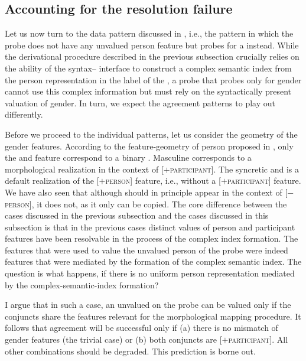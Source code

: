 \documentclass[output=paper,modfontsnewtxmath,hidelinks]{langscibook}
\begin{document}
\subsection{Accounting for the resolution failure}

Let us now turn to the data pattern discussed in , i.e., the pattern in which the probe does not have any unvalued person feature but probes for a  instead. While the derivational procedure described in the previous subsection crucially relies on the ability of the syntax-- interface to construct a complex semantic index from the person representation in the label of the , a probe that probes only for gender cannot use this complex information but must rely on the syntactically present valuation of gender. In turn, we expect the agreement patterns to play out differently. 

Before we proceed to the individual patterns, let us consider the geometry of the gender features. According to the feature-geometry of person proposed in , only the   and  feature correspond to a binary . Masculine  corresponds to a morphological realization in the context of [$+$\textsc{participant}]. The syncretic   and   is a default realization of the [$+$\textsc{person}] feature, i.e., without a  [$+$\textsc{participant}] feature. We have also seen that although  should in principle appear in the context of [$-$\textsc{person}], it does not, as it only can be copied. The core difference between the cases discussed in the previous subsection and the cases discussed in this subsection is that in the previous cases distinct values of person and participant features have been resolvable in the process of the complex index formation. The features that were used to value the unvalued person of the probe were indeed features that were mediated by the formation of the complex semantic index. The question is what happens, if there is no uniform person representation mediated by the complex-semantic-index formation?

I argue that in such a case, an unvalued  on the probe can be valued only if the conjuncts share the features relevant for the morphological mapping procedure. It follows that agreement will be successful only if (a) there is no mismatch of gender features (the trivial case) or (b) both conjuncts are [$+$\textsc{participant}]. All other combinations should be degraded. This prediction is borne out.
\end{document}
